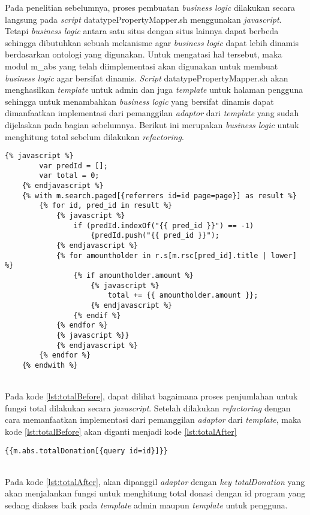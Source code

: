 	Pada penelitian sebelumnya, proses pembuatan \textit{business logic} dilakukan secara langsung pada \textit{script} datatypePropertyMapper.sh menggunakan \textit{javascript}. Tetapi \textit{business logic} antara satu situs dengan situs lainnya dapat berbeda sehingga dibutuhkan sebuah mekanisme agar \textit{business logic} dapat lebih dinamis berdasarkan ontologi yang digunakan. Untuk mengatasi hal tersebut, maka modul m\_abs yang telah diimplementasi akan digunakan untuk membuat \textit{business logic} agar bersifat dinamis. \textit{Script} datatypePropertyMapper.sh akan menghasilkan \textit{template} untuk admin dan juga \textit{template} untuk halaman pengguna sehingga untuk menambahkan \textit{business logic} yang bersifat dinamis dapat dimanfaatkan implementasi dari pemanggilan \textit{adaptor} dari \textit{template} yang sudah dijelaskan pada bagian sebelumnya. Berikut ini merupakan \textit{business logic} untuk menghitung total sebelum dilakukan \textit{refactoring}.
	
	\begin{minipage}{\linewidth}
	\begin{lstlisting}[caption={Fungsi total sebelum refactoring},label={lst:totalBefore}]
	{% javascript %}
		var predId = [];
		var total = 0;
	{% endjavascript %}
	{% with m.search.paged[{referrers id=id page=page}] as result %}
		{% for id, pred_id in result %}
			{% javascript %}
				if (predId.indexOf("{{ pred_id }}") == -1)
					{predId.push("{{ pred_id }}");
			{% endjavascript %}
			{% for amountholder in r.s[m.rsc[pred_id].title | lower] %}
				{% if amountholder.amount %}
					{% javascript %}
						total += {{ amountholder.amount }};
					{% endjavascript %}
				{% endif %}
			{% endfor %}
			{% javascript %}}
			{% endjavascript %}
		{% endfor %}
	{% endwith %}
	\end{lstlisting}
	\end{minipage} \\

	Pada kode \ref{lst:totalBefore}, dapat dilihat bagaimana proses penjumlahan untuk fungsi total dilakukan secara \textit{javascript}. Setelah dilakukan \textit{refactoring} dengan cara memanfaatkan implementasi dari pemanggilan \textit{adaptor} dari \textit{template}, maka kode \ref{lst:totalBefore} akan diganti menjadi kode \ref{lst:totalAfter}
	\begin{minipage}{\linewidth}
	\begin{lstlisting}[caption={Fungsi total setelah refactoring}, label={lst:totalAfter}]
	{{m.abs.totalDonation[{query id=id}]}}
	\end{lstlisting}
	\end{minipage} \\

	Pada kode \ref{lst:totalAfter}, akan dipanggil \textit{adaptor} dengan \textit{key totalDonation} yang akan menjalankan fungsi untuk menghitung total donasi dengan id program yang sedang diakses baik pada \textit{template} admin maupun \textit{template} untuk pengguna.
